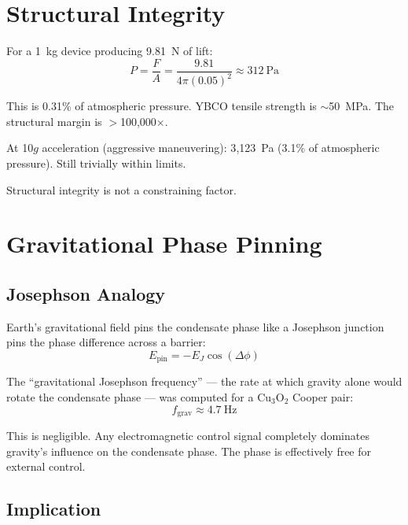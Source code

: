 \documentclass[11pt, a4paper]{article}
\begin{document}
\section{Structural Integrity}

For a 1~kg device producing 9.81~N of lift:
\begin{equation}
  P = \frac{F}{A} = \frac{9.81}{4\pi(0.05)^2}
  \approx 312~\text{Pa}
\end{equation}

This is 0.31\% of atmospheric pressure. YBCO tensile strength
is $\sim$50~MPa. The structural margin is $>$100{,}000$\times$.

At 10$g$ acceleration (aggressive maneuvering): 3{,}123~Pa
(3.1\% of atmospheric pressure). Still trivially within limits.

Structural integrity is not a constraining factor.

\section{Gravitational Phase Pinning}

\subsection{Josephson Analogy}

Earth's gravitational field pins the condensate phase like a
Josephson junction pins the phase difference across a barrier:
\begin{equation}
  E_{\text{pin}} = -E_J \cos(\Delta\phi)
\end{equation}

The ``gravitational Josephson frequency'' --- the rate at which
gravity alone would rotate the condensate phase --- was computed
for a Cu$_3$O$_2$ Cooper pair:
\begin{equation}
  f_{\text{grav}} \approx 4.7~\text{Hz}
\end{equation}

This is negligible. Any electromagnetic control signal
completely dominates gravity's influence on the condensate phase.
The phase is effectively free for external control.

\subsection{Implication}
\end{document}
